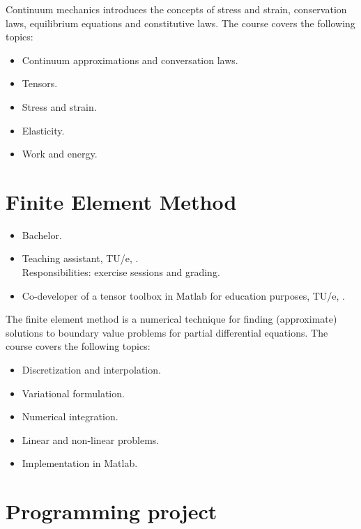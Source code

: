 \documentclass{goose-article}
\begin{document}
\noindent
Continuum mechanics introduces the concepts of stress and strain, conservation laws, equilibrium equations and constitutive laws.
The course covers the following topics:

\begin{itemize}
    \item Continuum approximations and conversation laws.
    \item Tensors.
    \item Stress and strain.
    \item Elasticity.
    \item Work and energy.
\end{itemize}

\clearpage
\section*{Finite Element Method}

\begin{tcolorbox}
    \begin{itemize}
        \item Bachelor.
        \item Teaching assistant, TU/e, \MyDateTeachingTUeFEM.
        \\
        Responsibilities: exercise sessions and grading.
        \item Co-developer of a tensor toolbox in Matlab for education purposes, TU/e, \MyDateTeachingTUeMatlab.
    \end{itemize}
\end{tcolorbox}

\noindent
The finite element method is a numerical technique for finding (approximate) solutions to boundary value problems for partial differential equations.
The course covers the following topics:

\begin{itemize}
    \item Discretization and interpolation.
    \item Variational formulation.
    \item Numerical integration.
    \item Linear and non-linear problems.
    \item Implementation in Matlab.
\end{itemize}

\section*{Programming project}
\end{document}
